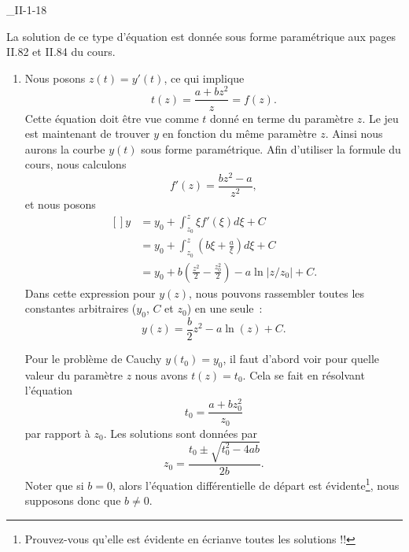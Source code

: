 

\begin{corrige}{_II-1-18}

La solution de ce type d'équation est donnée sous forme paramétrique aux pages II.82 et II.84 du cours.

\begin{enumerate}

	\item
		Nous posons $z(t)=y'(t)$, ce qui implique
		\begin{equation}
			t(z)=\frac{ a+bz^2 }{ z }=f(z).
		\end{equation}
		Cette équation doit être vue comme $t$ donné en terme du paramètre $z$. Le jeu est maintenant de trouver $y$ en fonction du même paramètre $z$. Ainsi nous aurons la courbe $y(t)$ sous forme paramétrique. Afin d'utiliser la formule du cours, nous calculons
		\begin{equation}
			f'(z)=\frac{ bz^2-a }{ z^2 },
		\end{equation}
		et nous posons
		\begin{equation}
			\begin{aligned}[]
				y	&=y_0+\int_{z_0}^z \xi f'(\xi)d\xi +C\\
				&=y_0+\int_{z_0}^z(b\xi+\frac{ a }{ \xi })d\xi	+C\\
				&=y_0+b\left( \frac{ z^2 }{ 2 }-\frac{ z_0^2 }{2} \right)-a\ln| z/z_0 |+C.
			\end{aligned}
		\end{equation}
		Dans cette expression pour $y(z)$, nous pouvons rassembler toutes les constantes arbitraires ($y_0$, $C$ et $z_0$) en une seule~:
		\begin{equation}
			y(z)=\frac{ b }{2}z^2-a\ln(z)+C.
		\end{equation}
		
		Pour le problème de Cauchy $y(t_0)=y_0$, il faut d'abord voir pour quelle valeur du paramètre $z$ nous avons $t(z)=t_0$. Cela se fait en résolvant l'équation
		\begin{equation}
			t_0=\frac{ a+bz_0^2 }{ z_0 }
		\end{equation}
		par rapport à $z_0$. Les solutions sont données par
		\begin{equation}
			z_0=\frac{ t_0\pm\sqrt{t_0^2-4ab} }{ 2b }.
		\end{equation}
		Noter que si $b=0$, alors l'équation différentielle de départ est évidente\footnote{Prouvez-vous qu'elle est évidente en écrianve toutes les solutions !!}, nous supposons donc que $b\neq 0$. 


\end{enumerate}
\end{corrige}

